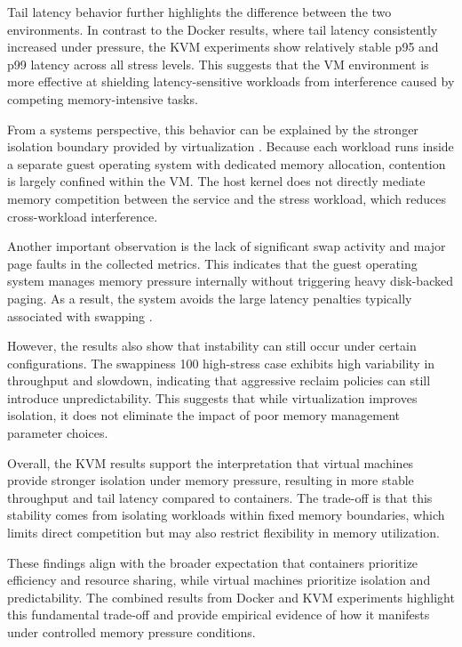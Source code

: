 \documentclass[conference]{IEEEtran}
\begin{document}
Tail latency behavior further highlights the difference between the two environments. In contrast to the Docker results, where tail latency consistently increased under pressure, the KVM experiments show relatively stable p95 and p99 latency across all stress levels. This suggests that the VM environment is more effective at shielding latency-sensitive workloads from interference caused by competing memory-intensive tasks.

From a systems perspective, this behavior can be explained by the stronger isolation boundary provided by virtualization \cite{felter2015comparison, WaldspurgerProceedingsOT}. Because each workload runs inside a separate guest operating system with dedicated memory allocation, contention is largely confined within the VM. The host kernel does not directly mediate memory competition between the service and the stress workload, which reduces cross-workload interference.

Another important observation is the lack of significant swap activity and major page faults in the collected metrics. This indicates that the guest operating system manages memory pressure internally without triggering heavy disk-backed paging. As a result, the system avoids the large latency penalties typically associated with swapping \cite{dean2013tail}.

However, the results also show that instability can still occur under certain configurations. The swappiness 100 high-stress case exhibits high variability in throughput and slowdown, indicating that aggressive reclaim policies can still introduce unpredictability. This suggests that while virtualization improves isolation, it does not eliminate the impact of poor memory management parameter choices.

Overall, the KVM results support the interpretation that virtual machines provide stronger isolation under memory pressure, resulting in more stable throughput and tail latency compared to containers. The trade-off is that this stability comes from isolating workloads within fixed memory boundaries, which limits direct competition but may also restrict flexibility in memory utilization.

These findings align with the broader expectation that containers prioritize efficiency and resource sharing, while virtual machines prioritize isolation and predictability. The combined results from Docker and KVM experiments highlight this fundamental trade-off and provide empirical evidence of how it manifests under controlled memory pressure conditions.
\end{document}
